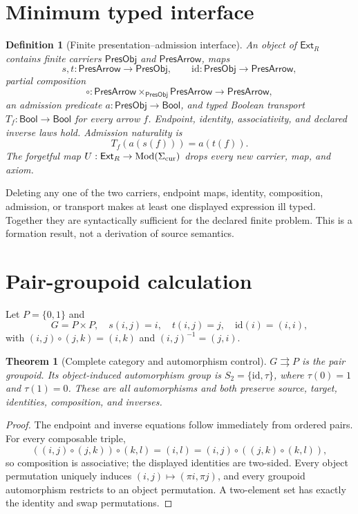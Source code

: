 \documentclass[11pt]{article}
\newtheorem{definition}{Definition}
\newtheorem{theorem}{Theorem}
\newcommand{\PresObj}{\mathsf{PresObj}}
\newcommand{\PresArrow}{\mathsf{PresArrow}}
\newcommand{\Bool}{\mathsf{Bool}}
\newcommand{\Ext}{\mathsf{Ext}_{R}}
\begin{document}
\section{Minimum typed interface}

\begin{definition}[Finite presentation--admission interface]
An object of $\Ext$ contains finite carriers $\PresObj$ and $\PresArrow$,
maps
\[
 s,t:\PresArrow\to\PresObj,\qquad
 \mathrm{id}:\PresObj\to\PresArrow,
\]
partial composition
\[
 \circ:\PresArrow\mathbin{\times_{\PresObj}}\PresArrow\to\PresArrow,
\]
an admission predicate $a:\PresObj\to\Bool$, and typed Boolean transport
$T_f:\Bool\to\Bool$ for every arrow $f$.  Endpoint, identity, associativity,
and declared inverse laws hold.  Admission naturality is
\[
 T_f(a(s(f)))=a(t(f)).
\]
The forgetful map $U:\Ext\to\mathrm{Mod}(\Sigma_{\rm cur})$ drops every new
carrier, map, and axiom.
\end{definition}

Deleting any one of the two carriers, endpoint maps, identity, composition,
admission, or transport makes at least one displayed expression ill typed.
Together they are syntactically sufficient for the declared finite problem.
This is a formation result, not a derivation of source semantics.

\section{Pair-groupoid calculation}

Let $P=\{0,1\}$ and
\[
 G=P\times P,
 \quad s(i,j)=i,\quad t(i,j)=j,\quad
 \mathrm{id}(i)=(i,i),
\]
with $(i,j)\circ(j,k)=(i,k)$ and $(i,j)^{-1}=(j,i)$.

\begin{theorem}[Complete category and automorphism control]
$G\rightrightarrows P$ is the pair groupoid.  Its object-induced
automorphism group is $S_2=\{\mathrm{id},\tau\}$, where
$\tau(0)=1$ and $\tau(1)=0$.  These are all automorphisms and both preserve
source, target, identities, composition, and inverses.
\end{theorem}

\begin{proof}
The endpoint and inverse equations follow immediately from ordered pairs.
For every composable triple,
\[
 ((i,j)\circ(j,k))\circ(k,l)=(i,l)
 =(i,j)\circ((j,k)\circ(k,l)),
\]
so composition is associative; the displayed identities are two-sided.
Every object permutation uniquely induces $(i,j)\mapsto(\pi i,\pi j)$, and
every groupoid automorphism restricts to an object permutation.  A two-element
set has exactly the identity and swap permutations.
\end{proof}
\end{document}
